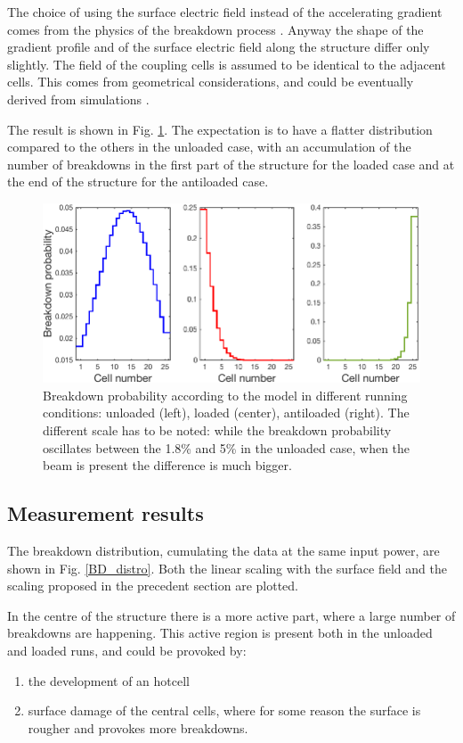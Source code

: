 The choice of using the surface electric field instead of the accelerating gradient comes from the physics of the breakdown process \cite{Walter:PC}. Anyway the shape of the gradient profile and of the surface electric field along the structure differ only slightly. The field of the coupling cells is assumed to be identical to the adjacent cells. This comes from geometrical considerations, and could be eventually derived from simulations \cite{Alexej:PC}.

The result is shown in Fig. \ref{BD_prob}. The expectation is to have a flatter distribution compared to the others in the unloaded case, with an accumulation of the number of breakdowns in the first part of the structure for the loaded case and at the end of the structure for the antiloaded case.


\begin{figure}[h]
\centering 
\includegraphics[scale=0.45]{pictures/BD_probability.png}
\caption{Breakdown probability according to the model in different running conditions: unloaded (left), loaded (center), antiloaded (right). The different scale has to be noted: while the breakdown probability oscillates between the 1.8\% and 5\% in the unloaded case, when the beam is present the difference is much bigger.}
\label{BD_prob}
\end{figure}


\subsection[Measurement results]{Measurement results}

The breakdown distribution, cumulating the data at the same input power, are shown in Fig. \ref{BD_distro}. Both the linear scaling with the surface field and the scaling proposed in the precedent section are plotted.

In the centre of the structure there is a more active part, where a large number of breakdowns are happening. This active region is present both in the unloaded and loaded runs, and could be provoked by: 
\begin{enumerate}
\item the development of an hotcell
\item surface damage of the central cells, where for some reason the surface is rougher and provokes more breakdowns. 
\end{enumerate}

